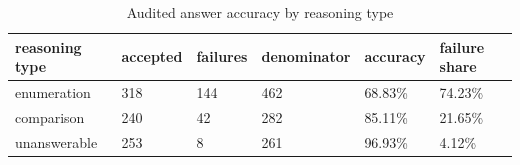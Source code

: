 \begin{table}[htbp]
\centering
\setlength{\tabcolsep}{5pt}
\caption{Audited answer accuracy by reasoning type}
\label{tab:d5c-reasoning-type}
\begin{tabular}{llllll}
\toprule
reasoning type & accepted & failures & denominator & accuracy & failure share \\
\midrule
enumeration & 318 & 144 & 462 & 68.83\% & 74.23\% \\
comparison & 240 & 42 & 282 & 85.11\% & 21.65\% \\
unanswerable & 253 & 8 & 261 & 96.93\% & 4.12\% \\
\bottomrule
\end{tabular}
\end{table}
